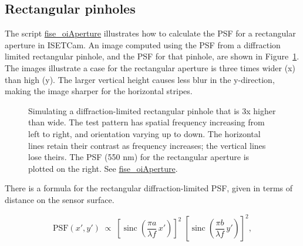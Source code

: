 \documentclass[
  letterpaper,
]{book}
\begin{document}
\subsection{Rectangular pinholes}\label{rectangular-pinholes}

The script
\href{../code/02Optics/fise_oiAperturemlx.html}{fise\_oiAperture}
illustrates how to calculate the PSF for a rectangular aperture in
ISETCam. An image computed using the PSF from a diffraction limited
rectangular pinhole, and the PSF for that pinhole, are shown in
Figure~\ref{fig-pinhole-rectangle}. The images illustrate a case for the
rectangular aperture is three times wider (x) than high (y). The larger
vertical height causes less blur in the y-direction, making the image
sharper for the horizontal stripes.

\begin{figure}


\caption{\label{fig-pinhole-rectangle}Simulating a diffraction-limited
rectangular pinhole that is 3x higher than wide. The test pattern has
spatial frequency increasing from left to right, and orientation varying
up to down. The horizontal lines retain their contrast as frequency
increases; the vertical lines lose theirs. The PSF (550 nm) for the
rectangular aperture is plotted on the right. See
\href{../code/02Optics/fise_oiAperturemlx.html}{fise\_oiAperture}.}

\end{figure}%

There is a formula for the rectangular diffraction-limited PSF, given in
terms of distance on the sensor surface.

\[
\text{PSF}(x',y') \;\propto\;
\left[\operatorname{sinc}\!\left(\frac{\pi a}{\lambda f}\,x'\right)\right]^2
\;\left[\operatorname{sinc}\!\left(\frac{\pi b}{\lambda f}\,y'\right)\right]^2,
\]
\end{document}
